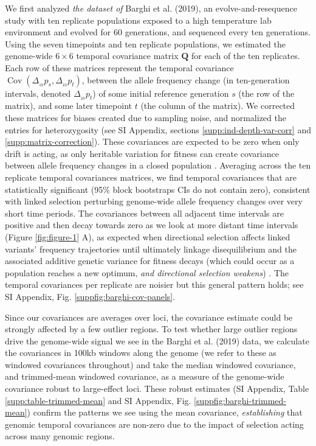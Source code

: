 \documentclass[9pt,twocolumn,twoside]{pnas-new}
\DeclareMathOperator{\cov}{Cov}
\newcommand{\vb}[1]{{\it \color{red} #1}}
\begin{document}
We first analyzed \vb{the dataset of} Barghi et al. (2019), an
evolve-and-resequence study with ten replicate populations exposed to a high
temperature lab environment and evolved for 60 generations, and sequenced every
ten generations. Using the seven timepoints and ten replicate populations, we
estimated the genome-wide $6 \times 6$ temporal covariance matrix $\mathbf{Q}$
for each of the ten replicates. Each row of these matrices represent the
temporal covariance $\cov(\Delta_{_{10}} p_s, \Delta_{_{10}} p_t)$, between the
allele frequency change (in ten-generation intervals, denoted $\Delta_{_{10}}
p_t$) of some initial reference generation $s$ (the row of the matrix), and
some later timepoint $t$ (the column of the matrix). We corrected these
matrices for biases created due to sampling noise, and normalized the entries
for heterozygosity (see SI Appendix, sections \ref{supp:ind-depth-var-corr} and
\ref{supp:matrix-correction}). These covariances are expected to be zero when
only drift is acting, as only heritable variation for fitness can create
covariance between allele frequency changes in a closed population
\cite{Buffalo2019-io}.  Averaging across the ten replicate temporal covariances
matrices, we find temporal covariances that are statistically significant (95\%
block bootstraps CIs do not contain zero), consistent with linked selection
perturbing genome-wide allele frequency changes over very short time periods.
The covariances between all adjacent time intervals are positive and then decay
towards zero as we look at more distant time intervals (Figure
\ref{fig:figure-1} A), as expected when directional selection affects linked
variants' frequency trajectories until ultimately linkage disequilibrium and
the associated additive genetic variance for fitness decays (which could occur
as a population reaches a new optimum, \vb{and directional selection weakens})
\cite{Buffalo2019-io}. The temporal covariances per replicate are noisier but
this general pattern holds; see SI Appendix, Fig.
\ref{suppfig:barghi-cov-panels}. 

Since our covariances are averages over loci, the covariance estimate could be
strongly affected by a few outlier regions. To test whether large outlier
regions drive the genome-wide signal we see in the Barghi et al. (2019) data,
we calculate the covariances in 100kb windows along the genome (we refer to
these as windowed covariances throughout) and take the median windowed
covariance, and trimmed-mean windowed covariance, as a measure of the
genome-wide covariance robust to large-effect loci. These robust estimates (SI
Appendix, Table \ref{supp:table-trimmed-mean} and SI Appendix, Fig.
\ref{suppfig:barghi-trimmed-mean}) confirm the patterns we see using the mean
covariance, \vb{establishing} that genomic temporal covariances are non-zero
due to the impact of selection acting across many genomic regions. 
\end{document}
